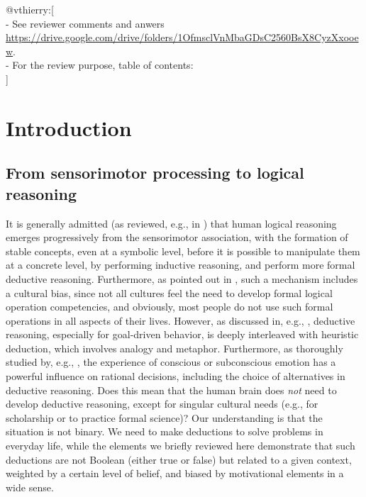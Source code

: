 \documentclass[sn-mathphys]{sn-jnl}
\makeatletter
\newcommand{\vthierry}[1]{{\color{magenta} @vthierry:[#1]}}
\renewcommand\tableofcontents{%
    \@starttoc{toc}%
}
\makeatother
\begin{document}
\vthierry{
\\- {See reviewer comments and anwers \href{here}{https://drive.google.com/drive/folders/1OfmsclVnMbaGDsC2560BsX8CyzXxooew}.}
\\- {For the review purpose, table of contents:} \\ {\tiny \tableofcontents}
}

\section{Introduction}

\subsection{From sensorimotor processing to logical reasoning}

It is generally admitted (as reviewed, e.g., in \cite{ness_knowledge_2007}) that human logical reasoning emerges progressively from the sensorimotor association, with the formation of stable concepts, even at a symbolic level, before it is possible to manipulate them at a concrete level, by performing inductive reasoning, and perform more formal deductive reasoning. Furthermore, as pointed out in \cite{arnett_adolescence_2001}, such a mechanism includes a cultural bias, since not all cultures feel the need to develop formal logical operation competencies, and obviously, most people do not use such formal operations in all aspects of their lives. However, as discussed in, e.g., \cite{keefer_metaphor_2016}, deductive reasoning, especially for goal-driven behavior, is deeply interleaved with heuristic deduction, which involves analogy and metaphor. Furthermore, as thoroughly studied by, e.g., \cite{purves_interplay_2001}, the experience of conscious or subconscious emotion has a powerful influence on rational decisions, including the choice of alternatives in deductive reasoning. Does this mean that the human brain does {\em not} need to develop deductive reasoning, except for singular cultural needs (e.g., for scholarship or to practice formal science)? Our understanding is that the situation is not binary. We need to make deductions to solve problems in everyday life, while the elements we briefly reviewed here demonstrate that such deductions are not Boolean (either true or false) but related to a given context, weighted by a certain level of belief, and biased by motivational elements in a wide sense.
\end{document}
